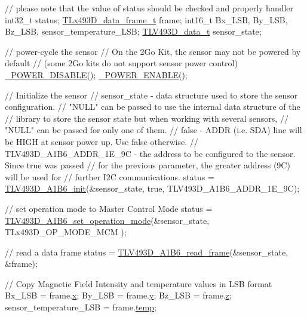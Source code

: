 \begin{DoxyCode}
\textcolor{comment}{// please note that the value of status should be checked and properly handler}
int32\_t status;
\mbox{\hyperlink{struct_t_lx493_d__data__frame__t}{TLx493D\_data\_frame\_t}} frame;
int16\_t Bx\_LSB, By\_LSB, Bz\_LSB, sensor\_temperature\_LSB;
\mbox{\hyperlink{struct_t_l_v493_d__data__t}{TLV493D\_data\_t}} sensor\_state;

\textcolor{comment}{// power-cycle the sensor}
\textcolor{comment}{// On the 2Go Kit, the sensor may not be powered by default}
\textcolor{comment}{// (some 2Go kits do not support sensor power control)}
\mbox{\hyperlink{interface_8h_abadb0076439c5df777bd4e545d82dcce}{\_POWER\_DISABLE}}();
\mbox{\hyperlink{interface_8h_a049c9e0574db2668751f73dcacaacfe7}{\_POWER\_ENABLE}}();

\textcolor{comment}{// Initialize the sensor}
\textcolor{comment}{// sensor\_state - data structure used to store the sensor configuration.}
\textcolor{comment}{//                "NULL" can be passed to use the internal data structure of the}
\textcolor{comment}{//                library to store the sensor state but when working with several sensors,}
\textcolor{comment}{//                "NULL" can be passed for only one of them.}
\textcolor{comment}{// false        - ADDR (i.e. SDA) line will be HIGH at sensor power up. Use false otherwise.}
\textcolor{comment}{// TLV493D\_A1B6\_ADDR\_1E\_9C - the address to be configured to the sensor. Since true was passed}
\textcolor{comment}{//                           for the previous parameter, the greater address (9C) will be used for}
\textcolor{comment}{//                           further I2C communications.}
status = \mbox{\hyperlink{_t_l_v___a1_b6_8c_a692d5541ead9ea1682f2f618490d549c}{TLV493D\_A1B6\_init}}(&sensor\_state, \textcolor{keyword}{true}, TLV493D\_A1B6\_ADDR\_1E\_9C);

\textcolor{comment}{// set operation mode to Master Control Mode}
status =  \mbox{\hyperlink{_t_l_v___a1_b6_8c_a67bb87180597a076f74ad907aa8e6bae}{TLV493D\_A1B6\_set\_operation\_mode}}(&sensor\_state, TLx493D\_OP\_MODE\_MCM
      );

\textcolor{comment}{// read a data frame}
status = \mbox{\hyperlink{_t_l_v___a1_b6_8c_aae1632aa63a45d4b9c57eb6857e7803b}{TLV493D\_A1B6\_read\_frame}}(&sensor\_state, &frame);

\textcolor{comment}{// Copy Magnetic Field Intensity and temperature values in LSB format}
Bx\_LSB = frame.\mbox{\hyperlink{struct_t_lx493_d__data__frame__t_ac9e9d1455533b3d2e417f2064982a31d}{x}};
By\_LSB = frame.\mbox{\hyperlink{struct_t_lx493_d__data__frame__t_a95882762f5a26aaed29610c8d4ed8b4c}{y}};
Bz\_LSB = frame.\mbox{\hyperlink{struct_t_lx493_d__data__frame__t_afc28475d31ed47440530c04d85958adb}{z}};
sensor\_temperature\_LSB = frame.\mbox{\hyperlink{struct_t_lx493_d__data__frame__t_a318d6cd91a330f561fd0bb7a36f555c8}{temp}};
\end{DoxyCode}


